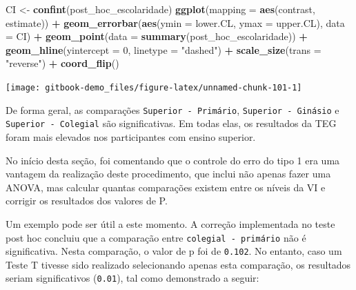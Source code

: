 \documentclass[
]{book}
\newenvironment{Shaded}{\begin{snugshade}}{\end{snugshade}}
\newcommand{\DataTypeTok}[1]{\textcolor[rgb]{0.13,0.29,0.53}{#1}}
\newcommand{\DecValTok}[1]{\textcolor[rgb]{0.00,0.00,0.81}{#1}}
\newcommand{\KeywordTok}[1]{\textcolor[rgb]{0.13,0.29,0.53}{\textbf{#1}}}
\newcommand{\NormalTok}[1]{#1}
\newcommand{\OperatorTok}[1]{\textcolor[rgb]{0.81,0.36,0.00}{\textbf{#1}}}
\newcommand{\StringTok}[1]{\textcolor[rgb]{0.31,0.60,0.02}{#1}}
\begin{document}
\begin{Shaded}
\begin{Highlighting}[]
\NormalTok{CI <-}\StringTok{ }\KeywordTok{confint}\NormalTok{(post_hoc_escolaridade)}
\KeywordTok{ggplot}\NormalTok{(}\DataTypeTok{mapping =} \KeywordTok{aes}\NormalTok{(contrast, estimate)) }\OperatorTok{+}
\StringTok{  }\KeywordTok{geom_errorbar}\NormalTok{(}\KeywordTok{aes}\NormalTok{(}\DataTypeTok{ymin =}\NormalTok{ lower.CL, }\DataTypeTok{ymax =}\NormalTok{ upper.CL), }\DataTypeTok{data =}\NormalTok{ CI) }\OperatorTok{+}
\StringTok{  }\KeywordTok{geom_point}\NormalTok{(}\DataTypeTok{data =} \KeywordTok{summary}\NormalTok{(post_hoc_escolaridade)) }\OperatorTok{+}
\StringTok{  }\KeywordTok{geom_hline}\NormalTok{(}\DataTypeTok{yintercept =} \DecValTok{0}\NormalTok{, }\DataTypeTok{linetype =} \StringTok{"dashed"}\NormalTok{) }\OperatorTok{+}\StringTok{ }
\StringTok{  }\KeywordTok{scale_size}\NormalTok{(}\DataTypeTok{trans =} \StringTok{"reverse"}\NormalTok{) }\OperatorTok{+}\StringTok{ }
\StringTok{  }\KeywordTok{coord_flip}\NormalTok{()}
\end{Highlighting}
\end{Shaded}

\begin{center}\texttt{[image: gitbook-demo\_files/figure-latex/unnamed-chunk-101-1]} \end{center}

De forma geral, as comparações \texttt{Superior\ -\ Primário}, \texttt{Superior\ -\ Ginásio} e \texttt{Superior\ -\ Colegial} são significativas. Em todas elas, os resultados da TEG foram mais elevados nos participantes com ensino superior.

No início desta seção, foi comentando que o controle do erro do tipo 1 era uma vantagem da realização deste procedimento, que inclui não apenas fazer uma ANOVA, mas calcular quantas comparações existem entre os níveis da VI e corrigir os resultados dos valores de P.

Um exemplo pode ser útil a este momento. A correção implementada no teste post hoc concluiu que a comparação entre \texttt{colegial\ -\ primário} não é significativa. Nesta comparação, o valor de p foi de \texttt{0.102}. No entanto, caso um Teste T tivesse sido realizado selecionando apenas esta comparação, os resultados seriam significativos (\texttt{0.01}), tal como demonstrado a seguir:

\begin{Shaded}
\end{Shaded}
\end{document}

